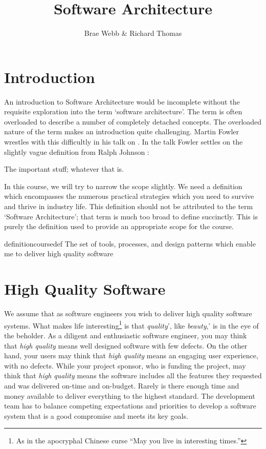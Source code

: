 \title{Software Architecture}
\author{Brae Webb \& Richard Thomas}
\date{}

\maketitle

\section{Introduction}
An introduction to Software Architecture would be incomplete without the requisite
exploration into the term `software architecture'.
The term is often overloaded to describe a number of completely detached concepts.
The overloaded nature of the term makes an introduction quite challenging.
Martin Fowler wrestles with this difficultly in his talk on .
In the talk Fowler settles on the slightly vague definition from Ralph Johnson \cite{fowler-what-is-architecture}:

\begin{definition}
The important stuff; whatever that is.
\end{definition}

In this course, we will try to narrow the scope slightly.
We need a definition which encompasses the numerous practical strategies which you need to survive and thrive in industry life.
This definition should not be attributed to the term `Software Architecture'; that term is much too broad to define succinctly.
This is purely the definition used to provide an appropriate scope for the course.

\begin{restatable}{definition}{coursedef}
The set of tools, processes, and design patterns which enable me to deliver high quality software
\end{restatable}

\section{High Quality Software}
We assume that as software engineers you wish to deliver high quality software systems.
What makes life interesting\footnote{As in the apocryphal Chinese curse ``May you live in interesting times.''}
is that \emph{quality}', like \emph{beauty},' is in the eye of the beholder.
As a diligent and enthusiastic software engineer, you may think that \emph{high quality} means well designed software with few defects.
On the other hand, your users may think that \emph{high quality} means an engaging user experience, with no defects.
While your project sponsor, who is funding the project, may think that \emph{high quality}
means the software includes all the features they requested and was delivered on-time and on-budget.
Rarely is there enough time and money available to deliver everything to the highest standard.
The development team has to balance competing expectations and priorities to develop a software system that is a good compromise and meets its key goals.

